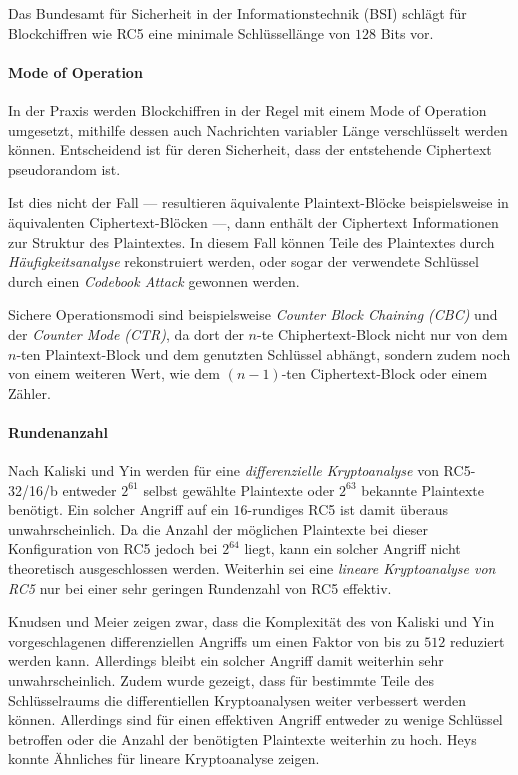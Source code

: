 \documentclass[course=erap]{aspdoc}
\begin{document}
Das Bundesamt für Sicherheit in der Informationstechnik (BSI) schlägt für Blockchiffren wie RC5 eine minimale Schlüssellänge von $128$ Bits vor.\cite[p.21]{bsi}

\paragraph{Mode of Operation} In der Praxis werden Blockchiffren in der Regel mit einem Mode of Operation umgesetzt, mithilfe dessen auch Nachrichten variabler Länge verschlüsselt werden können. Entscheidend ist für deren Sicherheit, dass der entstehende Ciphertext pseudorandom ist.\bigbreak

Ist dies nicht der Fall --- resultieren äquivalente Plaintext-Blöcke beispielsweise in äquivalenten Ciphertext-Blöcken ---, dann enthält der Ciphertext Informationen zur Struktur des Plaintextes\cite[p.22]{bsi}. In diesem Fall können Teile des Plaintextes durch \textit{Häufigkeitsanalyse} rekonstruiert werden\cite[p.22]{bsi}, oder sogar der verwendete Schlüssel durch einen \textit{Codebook Attack} gewonnen werden\cite[p.2]{elbaz}.\bigbreak

Sichere Operationsmodi sind beispielsweise \textit{Counter Block Chaining (CBC)} und der \textit{Counter Mode (CTR)}, da dort der $n$-te Chiphertext-Block nicht nur von dem $n$-ten Plaintext-Block und dem genutzten Schlüssel abhängt, sondern zudem noch von einem weiteren Wert, wie dem $(n-1)$-ten Ciphertext-Block oder einem Zähler.\cite[p.22]{bsi}

\paragraph{Rundenanzahl} Nach Kaliski und Yin werden für eine \textit{differenzielle Kryptoanalyse} von RC5-32/16/b entweder $2^{61}$ selbst gewählte Plaintexte oder $2^{63}$ bekannte Plaintexte benötigt. Ein solcher Angriff auf ein $16$-rundiges RC5 ist damit überaus unwahrscheinlich. Da die Anzahl der möglichen Plaintexte bei dieser Konfiguration von RC5 jedoch bei $2^{64}$ liegt, kann ein solcher Angriff nicht theoretisch ausgeschlossen werden.\cite[p.6]{kaliski+yin} Weiterhin sei eine \textit{lineare Kryptoanalyse von RC5} nur bei einer sehr geringen Rundenzahl von RC5 effektiv.\cite[p.28]{kaliski+yin}\bigbreak

Knudsen und Meier zeigen zwar, dass die Komplexität des von Kaliski und Yin vorgeschlagenen differenziellen Angriffs um einen Faktor von bis zu $512$ reduziert werden kann.\cite[p.2]{knudsen+meier} Allerdings bleibt ein solcher Angriff damit weiterhin sehr unwahrscheinlich. Zudem wurde gezeigt, dass für bestimmte Teile des Schlüsselraums die differentiellen Kryptoanalysen weiter verbessert werden können.\cite[p.13]{knudsen+meier} Allerdings sind für einen effektiven Angriff entweder zu wenige Schlüssel betroffen oder die Anzahl der benötigten Plaintexte weiterhin zu hoch. Heys konnte Ähnliches für lineare Kryptoanalyse zeigen.\cite[p.5]{heys}\bigbreak
\end{document}
